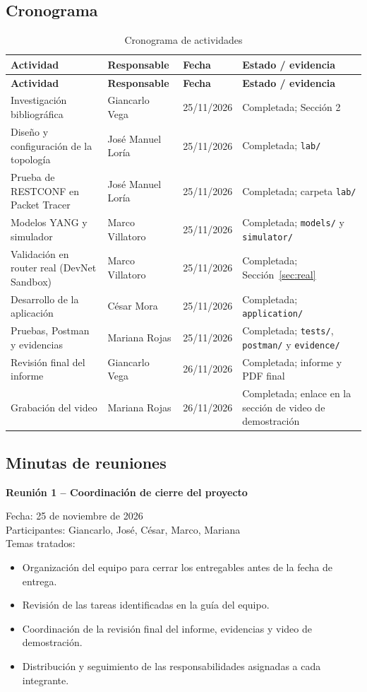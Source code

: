 \subsection{Cronograma}
\begin{longtable}{p{4.0cm}p{3.2cm}p{2.7cm}p{3.7cm}}
\caption{Cronograma de actividades}\\
\toprule
\textbf{Actividad} & \textbf{Responsable} & \textbf{Fecha} & \textbf{Estado / evidencia} \\
\midrule
\endfirsthead
\toprule
\textbf{Actividad} & \textbf{Responsable} & \textbf{Fecha} & \textbf{Estado / evidencia} \\
\midrule
\endhead
Investigación bibliográfica & Giancarlo Vega & 25/11/2026 & Completada; Sección 2 \\
Diseño y configuración de la topología & José Manuel Loría & 25/11/2026 & Completada; \texttt{lab/} \\
Prueba de RESTCONF en Packet Tracer & José Manuel Loría & 25/11/2026 & Completada; carpeta \texttt{lab/} \\
Modelos YANG y simulador & Marco Villatoro & 25/11/2026 & Completada; \texttt{models/} y \texttt{simulator/} \\
Validación en router real (DevNet Sandbox) & Marco Villatoro & 25/11/2026 & Completada; Sección~\ref{sec:real} \\
Desarrollo de la aplicación & César Mora & 25/11/2026 & Completada; \texttt{application/} \\
Pruebas, Postman y evidencias & Mariana Rojas & 25/11/2026 & Completada; \texttt{tests/}, \texttt{postman/} y \texttt{evidence/} \\
Revisión final del informe & Giancarlo Vega & 26/11/2026 & Completada; informe y PDF final \\
Grabación del video & Mariana Rojas & 26/11/2026 & Completada; enlace en la sección de video de demostración \\
\bottomrule
\end{longtable}

\subsection{Minutas de reuniones}
\vspace{0.4cm}

\textbf{Reunión 1 -- Coordinación de cierre del proyecto}\par
Fecha: 25 de noviembre de 2026\\
Participantes: Giancarlo, José, César, Marco, Mariana\\
Temas tratados:
\begin{itemize}
    \item Organización del equipo para cerrar los entregables antes de la fecha de entrega.
    \item Revisión de las tareas identificadas en la guía del equipo.
    \item Coordinación de la revisión final del informe, evidencias y video de demostración.
    \item Distribución y seguimiento de las responsabilidades asignadas a cada integrante.
\end{itemize}

